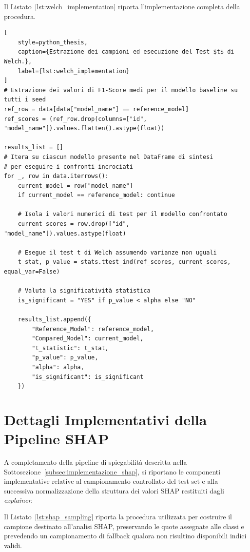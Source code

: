 Il Listato~\ref{lst:welch_implementation} riporta l'implementazione completa della procedura.

\begin{lstlisting}[
    style=python_thesis,
    caption={Estrazione dei campioni ed esecuzione del Test $t$ di Welch.},
    label={lst:welch_implementation}
]
# Estrazione dei valori di F1-Score medi per il modello baseline su tutti i seed
ref_row = data[data["model_name"] == reference_model]
ref_scores = (ref_row.drop(columns=["id", "model_name"]).values.flatten().astype(float))

results_list = []
# Itera su ciascun modello presente nel DataFrame di sintesi 
# per eseguire i confronti incrociati
for _, row in data.iterrows():
    current_model = row["model_name"]
    if current_model == reference_model: continue

    # Isola i valori numerici di test per il modello confrontato
    current_scores = row.drop(["id", "model_name"]).values.astype(float)

    # Esegue il test t di Welch assumendo varianze non uguali
    t_stat, p_value = stats.ttest_ind(ref_scores, current_scores, equal_var=False)

    # Valuta la significatività statistica
    is_significant = "YES" if p_value < alpha else "NO"

    results_list.append({
        "Reference_Model": reference_model,
        "Compared_Model": current_model,
        "t_statistic": t_stat,
        "p_value": p_value,
        "alpha": alpha,
        "is_significant": is_significant
    })
\end{lstlisting}



\section{Dettagli Implementativi della Pipeline SHAP}
\label{app:shap_implementation}

A completamento della pipeline di spiegabilità descritta nella Sottosezione~\ref{subsec:implementazione_shap}, si riportano le componenti implementative relative al campionamento controllato del test set e alla successiva normalizzazione della struttura dei valori SHAP restituiti dagli \textit{explainer}.

Il Listato~\ref{lst:shap_sampling} riporta la procedura utilizzata per costruire il campione destinato all'analisi SHAP, preservando le quote assegnate alle classi e prevedendo un campionamento di fallback qualora non risultino disponibili indici validi.

